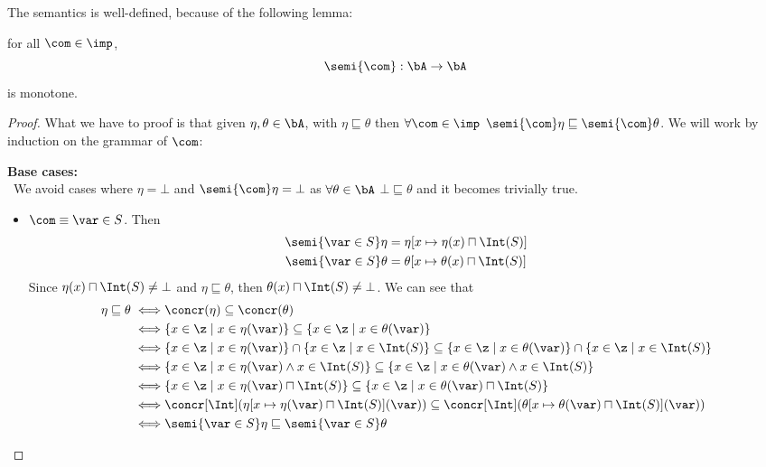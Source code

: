 The semantics is well-defined, because of the following lemma:

\begin{lemma}\label{le:monotone}
  for all \(\com \in \imp\), \[\semi{\com}: \bA \to \bA\] is
  monotone.
\end{lemma}

\begin{proof}
  What we have to proof is that given \(\eta, \theta \in \bA\), with
  \(\eta \sqsubseteq \theta\) then \(\forall \com \in \imp\)
  \(\semi{\com}\eta \sqsubseteq \semi{\com}\theta\). We will work by
  induction on the grammar of \(\com\):
  
  \noindent
  \textbf{Base cases:}\ \\ \ We avoid cases where \(\eta = \bot\) and
  \(\semi{\com}\eta = \bot\) as \(\forall \theta \in \bA\) \(\bot
  \sqsubseteq \theta\) and it becomes trivially true.
  \begin{itemize}
  \item \(\com \equiv \var \in S\). Then
    \begin{align*}
      \semi{\var \in S}\eta & = \eta[x\mapsto\eta(x) \sqcap \Int(S)] \\
      \semi{\var \in S}\theta & = \theta[x\mapsto \theta(x) \sqcap \Int(S)]
    \end{align*}
    Since \(\eta(x) \sqcap \Int(S) \neq \bot\) and \(\eta \sqsubseteq
    \theta\), then \(\theta(x) \sqcap \Int(S) \neq \bot\). We can see
    that
    \begin{align*}
      \eta \sqsubseteq \theta \iff & \concr(\eta) \subseteq \concr(\theta) \\
      \iff & \{x\in\z \mid x \in \eta(\var)\} \subseteq \{x\in\z \mid x \in \theta(\var)\} \\
      \iff & \{x\in\z \mid x \in \eta(\var)\} \cap \{x \in \z \mid x \in \Int(S)\} \subseteq \{x\in\z \mid x \in \theta(\var)\} \cap \{x \in \z \mid x \in \Int(S)\} \\
      \iff & \{x \in \z \mid x \in \eta(\var) \wedge x \in \Int(S)\} \subseteq \{x \in \z \mid x \in \theta(\var) \wedge x \in \Int(S)\} \\
      \iff & \{x \in \z \mid x \in \eta(\var) \sqcap \Int(S)\} \subseteq \{x \in \z \mid x \in \theta(\var) \sqcap \Int(S)\} \\
      \iff & \concr[\Int](\eta[x\mapsto \eta(\var) \sqcap \Int(S)](\var)) \subseteq \concr[\Int](\theta[x\mapsto \theta(\var) \sqcap \Int(S)](\var)) \\
      \iff & \semi{\var \in S}\eta \sqsubseteq \semi{\var \in S}\theta

\end{align*}
\end{itemize}
\end{proof}
